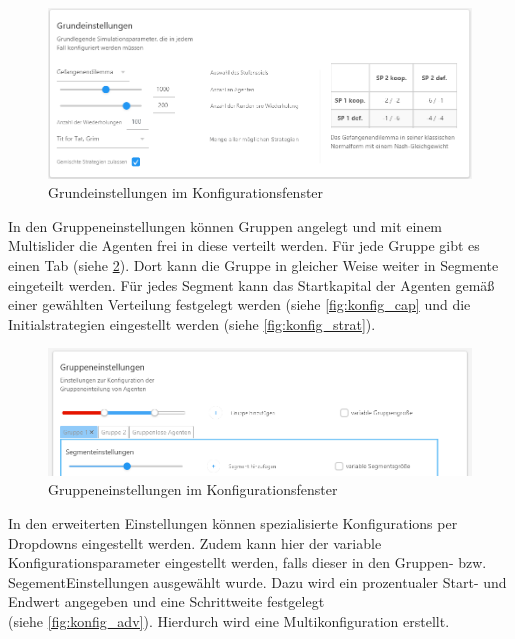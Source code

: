 \documentclass[parskip=full,11pt]{scrartcl}
\begin{document}
\begin{figure}[ht]
	\centering
	\includegraphics[width=\textwidth]{images/konfig_main.png}
	\caption{\label{fig:konfig_main}
		Grundeinstellungen im Konfigurationsfenster}
\end{figure}
\newpage
In den Gruppeneinstellungen können Gruppen angelegt und mit einem \Gls{Multislider} die Agenten frei in diese verteilt werden. Für jede Gruppe gibt es einen Tab (siehe \cref{fig:konfig_group}). Dort kann die Gruppe in gleicher Weise weiter in Segmente eingeteilt werden. Für jedes Segment kann das Startkapital der Agenten gemäß einer gewählten Verteilung festgelegt werden (siehe \cref{fig:konfig_cap} und die Initialstrategien eingestellt werden (siehe \cref{fig:konfig_strat}).



\begin{figure}[ht]
	\centering
	\includegraphics[width=\textwidth]{images/konfig_group.png}
	\caption{\label{fig:konfig_group}
		Gruppeneinstellungen im Konfigurationsfenster}
\end{figure}


In den erweiterten Einstellungen können spezialisierte \Glspl{Konfiguration} per Dropdowns eingestellt werden. Zudem kann hier der variable Konfigurationsparameter eingestellt werden, falls dieser in den Gruppen- bzw. SegementEinstellungen ausgewählt wurde. Dazu wird ein prozentualer Start- und Endwert angegeben und eine Schrittweite festgelegt \\(siehe \cref{fig:konfig_adv}). Hierdurch wird eine Multikonfiguration erstellt.
\end{document}
